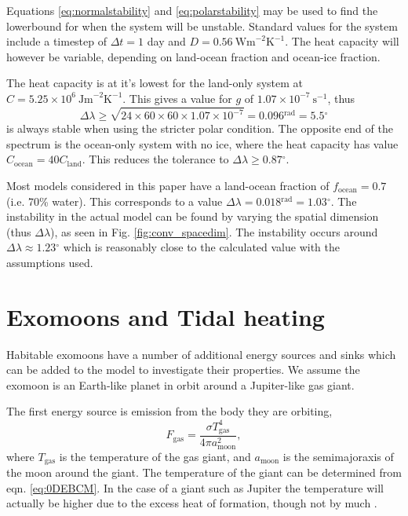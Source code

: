 \documentclass[12pt, onecolumn]{revtex4-2}    %
\newcommand{\heatcap}{\ensuremath{\ \text{Jm}^{-2} \text{K}^{-1}}}
\newcommand{\diffusion}{\ensuremath{\ \text{Wm}^{-2} \text{K}^{-1}}}
\newcommand{\radians}{\ensuremath{^{\text{rad}}}}
\newcommand{\degrees}{\ensuremath{^{\circ}}}
\begin{document}
Equations \eqref{eq:normalstability} and \eqref{eq:polarstability} may be used to find the lowerbound for when the system will be unstable.
Standard values for the system include a timestep of $\Delta t = 1$ day and $D = 0.56 \diffusion$.
The heat capacity will however be variable, depending on land-ocean fraction and ocean-ice fraction.

The heat capacity is at it's lowest for the land-only system at $C=5.25\times10^6 \heatcap$.
This gives a value for $g$ of $1.07\times10^{-7} \ \text{s}^{-1}$, thus
\begin{equation*}
    \Delta\lambda \ge \sqrt{24\times60\times60\times1.07\times10^{-7}} = 0.096\radians = 5.5\degrees
\end{equation*}
is always stable when using the stricter polar condition.
The opposite end of the spectrum is the ocean-only system with no ice, where the heat capacity has value $C_{\text{ocean}} = 40 C_{\text{land}}$.
This reduces the tolerance to $\Delta\lambda \ge 0.87 \degrees$.

Most models considered in this paper have a land-ocean fraction of $f_{\text{ocean}} = 0.7$ (i.e. 70\% water).
This corresponds to a value $\Delta\lambda = 0.018\radians = 1.03\degrees$.
The instability in the actual model can be found by varying the spatial dimension (thus $\Delta \lambda$), as seen in Fig. \ref{fig:conv_spacedim}.
The instability occurs around $\Delta\lambda \approx 1.23\degrees$ which is reasonably close to the calculated value with the assumptions used.

\section{Exomoons and Tidal heating} \label{sec:tidal_heating}

Habitable exomoons have a number of additional energy sources and sinks which can be added to the model to investigate their properties.
We assume the exomoon is an Earth-like planet in orbit around a Jupiter-like gas giant.

The first energy source is emission from the body they are orbiting,
\begin{equation}
    F_{\text{gas}} = \frac{\sigma T_{\text{gas}}^4}{4 \pi a_{\text{moon}}^2},
\end{equation}
where $T_{\text{gas}}$ is the temperature of the gas giant, and $a_{\text{moon}}$ is the semimajoraxis of the moon around the giant.
The temperature of the giant can be determined from eqn. \eqref{eq:0DEBCM}.
In the case of a giant such as Jupiter the temperature will actually be higher due to the excess heat of formation, though not by much \cite{LJW2018}.
\end{document}
